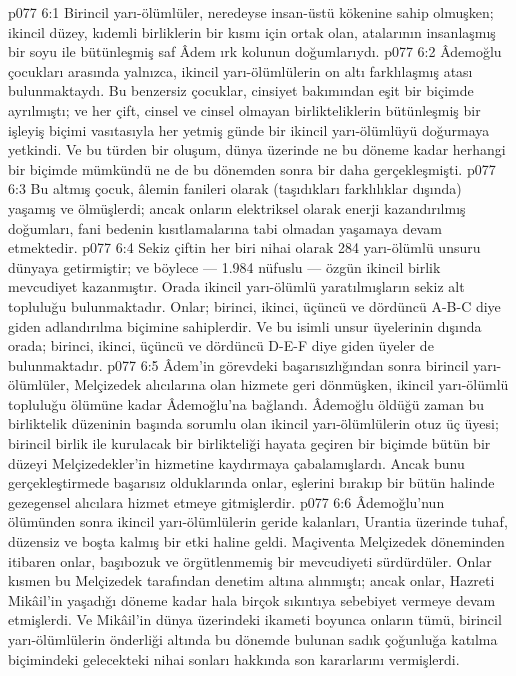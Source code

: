 \vs p077 6:1 Birincil yarı\hyp{}ölümlüler, neredeyse insan\hyp{}üstü kökenine sahip olmuşken; ikincil düzey, kıdemli birliklerin bir kısmı için ortak olan, atalarının insanlaşmış bir soyu ile bütünleşmiş saf Âdem ırk kolunun doğumlarıydı.
\vs p077 6:2 Âdemoğlu çocukları arasında yalnızca, ikincil yarı\hyp{}ölümlülerin on altı farklılaşmış atası bulunmaktaydı. Bu benzersiz çocuklar, cinsiyet bakımından eşit bir biçimde ayrılmıştı; ve her çift, cinsel ve cinsel olmayan birlikteliklerin bütünleşmiş bir işleyiş biçimi vasıtasıyla her yetmiş günde bir ikincil yarı\hyp{}ölümlüyü doğurmaya yetkindi. Ve bu türden bir oluşum, dünya üzerinde ne bu döneme kadar herhangi bir biçimde mümkündü ne de bu dönemden sonra bir daha gerçekleşmişti.
\vs p077 6:3 Bu altmış çocuk, âlemin fanileri olarak (taşıdıkları farklılıklar dışında) yaşamış ve ölmüşlerdi; ancak onların elektriksel olarak enerji kazandırılmış doğumları, fani bedenin kısıtlamalarına tabi olmadan yaşamaya devam etmektedir.
\vs p077 6:4 Sekiz çiftin her biri nihai olarak 284 yarı\hyp{}ölümlü unsuru dünyaya getirmiştir; ve böylece --- 1.984 nüfuslu --- özgün ikincil birlik mevcudiyet kazanmıştır. Orada ikincil yarı\hyp{}ölümlü yaratılmışların sekiz alt topluluğu bulunmaktadır. Onlar; birinci, ikinci, üçüncü ve dördüncü A\hyp{}B\hyp{}C diye giden adlandırılma biçimine sahiplerdir. Ve bu isimli unsur üyelerinin dışında orada; birinci, ikinci, üçüncü ve dördüncü D\hyp{}E\hyp{}F diye giden üyeler de bulunmaktadır.
\vs p077 6:5 Âdem’in görevdeki başarısızlığından sonra birincil yarı\hyp{}ölümlüler, Melçizedek alıcılarına olan hizmete geri dönmüşken, ikincil yarı\hyp{}ölümlü topluluğu ölümüne kadar Âdemoğlu’na bağlandı. Âdemoğlu öldüğü zaman bu birliktelik düzeninin başında sorumlu olan ikincil yarı\hyp{}ölümlülerin otuz üç üyesi; birincil birlik ile kurulacak bir birlikteliği hayata geçiren bir biçimde bütün bir düzeyi Melçizedekler’in hizmetine kaydırmaya çabalamışlardı. Ancak bunu gerçekleştirmede başarısız olduklarında onlar, eşlerini bırakıp bir bütün halinde gezegensel alıcılara hizmet etmeye gitmişlerdir.
\vs p077 6:6 Âdemoğlu’nun ölümünden sonra ikincil yarı\hyp{}ölümlülerin geride kalanları, Urantia üzerinde tuhaf, düzensiz ve boşta kalmış bir etki haline geldi. Maçiventa Melçizedek döneminden itibaren onlar, başıbozuk ve örgütlenmemiş bir mevcudiyeti sürdürdüler. Onlar kısmen bu Melçizedek tarafından denetim altına alınmıştı; ancak onlar, Hazreti Mikâil’in yaşadığı döneme kadar hala birçok sıkıntıya sebebiyet vermeye devam etmişlerdi. Ve Mikâil’in dünya üzerindeki ikameti boyunca onların tümü, birincil yarı\hyp{}ölümlülerin önderliği altında bu dönemde bulunan sadık çoğunluğa katılma biçimindeki gelecekteki nihai sonları hakkında son kararlarını vermişlerdi.
